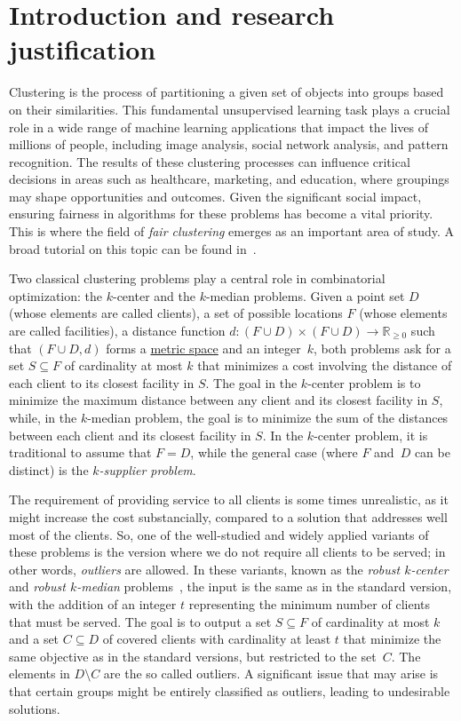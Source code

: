 \documentclass[12pt]{article}
\begin{document}
\section{Introduction and research justification} %
Clustering is the process of partitioning a given set of objects into groups based on their similarities. 
This fundamental unsupervised learning task plays a crucial role in a wide range of machine learning applications that impact the lives of millions of people, including image analysis, social network analysis, and pattern recognition. 
The results of these clustering processes can influence critical decisions in areas such as healthcare, marketing, and education, where groupings may shape opportunities and outcomes.
Given the significant social impact, ensuring fairness in algorithms for these problems has become a vital priority. 
This is where the field of \emph{fair clustering} emerges as an important area of study.
A broad tutorial on this topic can be found in~\cite{FairClusteringTutorial}.

Two classical clustering problems play a central role in combinatorial optimization: the $k$-center and the $k$-median problems. 
Given a point set $D$ (whose elements are called clients), a set of possible locations $F$ (whose elements are called facilities), a distance function $d : (F \cup D) \times (F \cup D) \rightarrow \mathbb{R}_{\geq 0}$ such that $(F\cup D, d)$ forms a \href{https://en.wikipedia.org/wiki/Metric_space}{metric space} and an integer~$k$, both problems ask for a set $S \subseteq F$ of cardinality at most $k$ that minimizes a cost involving the distance of each client to its closest facility in $S$.
The goal in the $k$-center problem is to minimize the maximum distance between any client and its closest facility in $S$, while, in the $k$-median problem, the goal is to minimize the sum of the distances between each client and its closest facility in $S$.
In the $k$-center problem, it is traditional to assume that $F=D$, while the general case (where $F$ and~$D$ can be distinct) is the \emph{$k$-supplier problem}.

The requirement of providing service to all clients is some times unrealistic, as it might increase the cost substancially, compared to a solution that addresses well most of the clients. 
So, one of the well-studied and widely applied variants of these problems is the version where we do not require all clients to be served; in other words, \emph{outliers} are allowed. 
In these variants, known as the \emph{robust $k$-center} and \emph{robust $k$-median} problems~\cite{CharikarKMN2001}, the input is the same as in the standard version, with the addition of an integer $t$ representing the minimum number of clients that must be served. 
The goal is to output a set $S \subseteq F$ of cardinality at most $k$ and a set $C \subseteq D$ of covered clients with cardinality at least $t$ that minimize the same objective as in the standard versions, but restricted to the set~$C$.  The elements in $D \setminus C$ are the so called outliers.  A significant issue that may arise is that certain groups might be entirely classified as outliers, leading to undesirable solutions.
\end{document}
